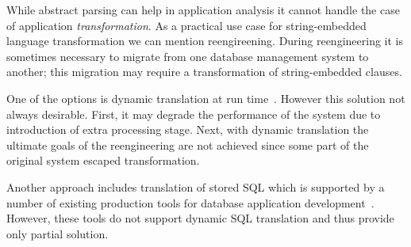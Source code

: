 While abstract parsing can help in application analysis it cannot handle the case of application
\emph{transformation}. As a practical use case for string-embedded language transformation we can mention
reengireening. During reengineering it is sometimes necessary to migrate from one database management 
system to another; this migration may require a transformation of string-embedded 
clauses. 

One of the options is dynamic translation at run time~\cite{OpenSystemsDBMS}. However this solution
not always desirable. First, it may degrade the performance of the system due to introduction of extra 
processing stage. Next, with dynamic translation the ultimate goals of the reengineering are not achieved 
since some part of the original system escaped transformation. 

Another approach includes translation of stored SQL which is supported by a number of existing production tools 
for database application development~\cite{PLSQL,SwissSQL,SQLWays}. However, these tools do not support 
dynamic SQL translation and thus provide only partial solution. 






